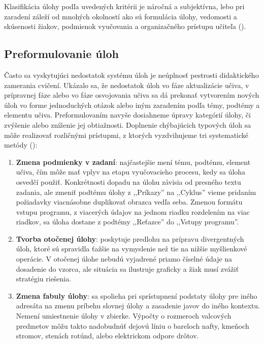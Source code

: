 Klasifikácia úlohy podľa uvedených kritérii je náročná a subjektívna, lebo pri zaradení záleží od mnohých okolností ako sú formulácia úlohy, vedomosti a skúsenosti žiakov, podmienok vyučovania a organizačného prístupu učiteľa (\cite{mindakova_tvorba_2008}). 

\subsection{Preformulovanie úloh}
Často sa vyskytujúci nedostatok systému úloh je neúplnosť pestrosti didaktického zamerania cvičení. Ukázalo sa, že nedostatok úloh vo fáze aktualizácie učiva, v prípravnej fáze alebo vo fáze osvojovania učiva sa dá prekonať vytvorením nových úloh vo forme jednoduchých otázok alebo iným zaradením podľa témy, podtémy a elementu učiva. Preformulovaním navyše dosiahneme úpravy kategórií úlohy, či zvýšenie alebo zníženie jej obtiažnosti. Doplnenie chýbajúcich typových úloh sa môže realizovať rozličnými prístupmi, z ktorých vyzdvihujeme tri systematické metódy (\cite{mindakova_tvorba_2008}):

\begin{enumerate}[label=\alph*),noitemsep,topsep=0pt]
\item \textbf{Zmena podmienky v zadaní}: najčastejšie mení tému, podtému, element učiva, čím môže mať vplyv na etapu vyučovacieho procesu, kedy sa úloha osvedčí použiť. Konkrétnosti dopadu na úlohu závisia od presného textu zadania, ale zmeniť podtému úlohy z ,,Príkazy'' na ,,Cyklus'' vieme pridaním požiadavky viacnásobne duplikovať obrazca vedľa seba. Zmenou formátu vstupu programu, z viacerých údajov na jednom riadku rozdelením na viac riadkov, sa úloha dostane z podtémy ,,Reťazce'' do ,,Vstupy programu''.
\item \textbf{Tvorba otočenej úlohy}: poskytuje predlohu na prípravu divergentných úloh, ktoré sú spravidla ťažšie na vymyslenie než tie na nižšie myšlienkové operácie. V otočenej úlohe nebudú vyjadrené priamo číselné údaje na dosadenie do vzorca, ale situácia sa ilustruje graficky a žiak musí zvážiť stratégiu riešenia.
\item \textbf{Zmena fabuly úlohy}: sa spolieha pri sprístupnení podstaty úlohy pre iného adresáta na zmenu príbehu slovnej úlohy a zasadenie javov do iného kontextu. Nemení umiestnenie úlohy v zbierke. Výpočty o rozmeroch valcových predmetov môžu takto nadobudnúť dejovú líniu o bareloch nafty, kmeňoch stromov, stenách rotúnd, alebo elektrickom odpore drôtov.
\end{enumerate}

